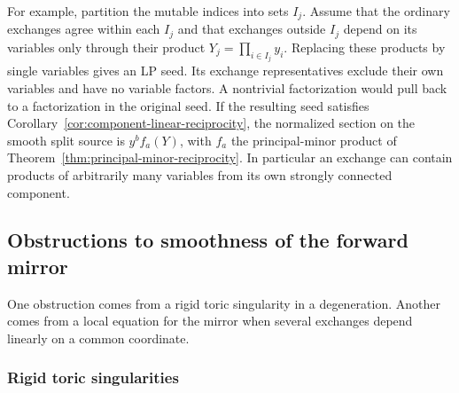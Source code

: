 \documentclass[11pt,reqno]{amsart}
\numberwithin{equation}{section}
\theoremstyle{definition}
\theoremstyle{remark}
\begin{document}
For example, partition the mutable indices into sets \(I_j\).
Assume that the ordinary exchanges agree within each \(I_j\) and
that exchanges outside \(I_j\) depend on its variables only through
their product \(Y_j=\prod_{i\in I_j}y_i\). Replacing these products by
single variables gives an LP seed. Its exchange representatives
exclude their own variables and have no variable factors. A
nontrivial factorization would pull back to a factorization in the
original seed. If the resulting seed satisfies
Corollary~\ref{cor:component-linear-reciprocity}, the normalized
section on the smooth split source is \(y^bf_a(Y)\), with \(f_a\)
the principal-minor product of Theorem~\ref{thm:principal-minor-reciprocity}.
In particular an exchange can contain products of arbitrarily many
variables from its own strongly connected component.

\subsection{Obstructions to smoothness of the forward mirror}

One obstruction comes from a rigid toric singularity in a degeneration.
Another comes from a local equation for the mirror when several exchanges
depend linearly on a common coordinate.

\subsubsection{Rigid toric singularities}
\end{document}
